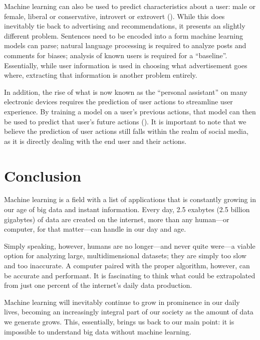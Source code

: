 \documentclass{comjnl}
\numberwithin{equation}{subsection}
\begin{document}
        Machine learning can also be used to predict characteristics about a user: male or female,
        liberal or conservative, introvert or extrovert (\cite{pennacchiottim}). While this does
        inevitably tie back to advertising and recommendations, it presents an slightly different
        problem. Sentences need to be encoded into a form machine learning models can parse; natural
        language processing is required to analyze posts and comments for biases; analysis of known
        users is required for a ``baseline''. Essentially, while user information is used in
        choosing what advertisement goes where, extracting that information is another problem
        entirely.

        In addition, the rise of what is now known as the ``personal assistant'' on many electronic
        devices requires the prediction of user actions to streamline user experience. By training
        a model on a user's previous actions, that model can then be used to predict that user's
        future actions (\cite{stuartl}). It is important to note that we believe the prediction of
        user actions still falls within the realm of social media, as it is directly dealing with
        the end user and their actions.


    \section{Conclusion}\label{sec:concl}

        Machine learning is a field with a list of applications that is constantly growing in our
        age of big data and instant information. Every day, 2.5 exabytes (2.5 billion gigabytes) of
        data are created on the internet, more than any human---or computer, for that matter---can
        handle in our day and age.

        Simply speaking, however, humans are no longer---and never quite were---a viable option for
        analyzing large, multidimensional datasets; they are simply too slow and too inaccurate. A
        computer paired with the proper algorithm, however, can be accurate and performant. It is
        fascinating to think what could be extrapolated from just one percent of the internet's
        daily data production.

        Machine learning will inevitably continue to grow in prominence in our daily lives, becoming
        an increasingly integral part of our society as the amount of data we generate grows. This,
        essentially, brings us back to our main point: it is impossible to understand big data
        without machine learning.


    \nocite{*}
    \printbibliography
\end{document}
